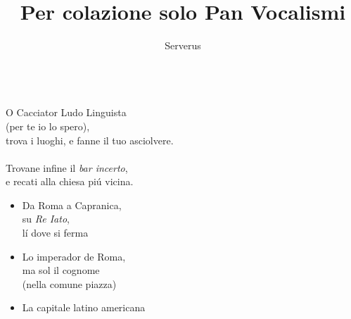 \documentclass[12pt]{article}
\title{Per colazione solo Pan Vocalismi}
\author{Serverus}
\date{}
\begin{document}
\maketitle

\ \\
O Cacciator Ludo Linguista \\
(per te io lo spero),\\
trova i luoghi, e fanne il tuo asciolvere.\\
\ \\
Trovane infine il \textit{bar incerto},\\
e recati alla chiesa piú vicina.

\begin{itemize}
\item Da Roma a Capranica, \\su \textit{Re Iato}, \\
  lí dove si ferma

\item Lo imperador de Roma, \\ma sol il cognome\\
  (nella comune piazza)

\item La capitale latino americana

\end{itemize}
\end{document}

